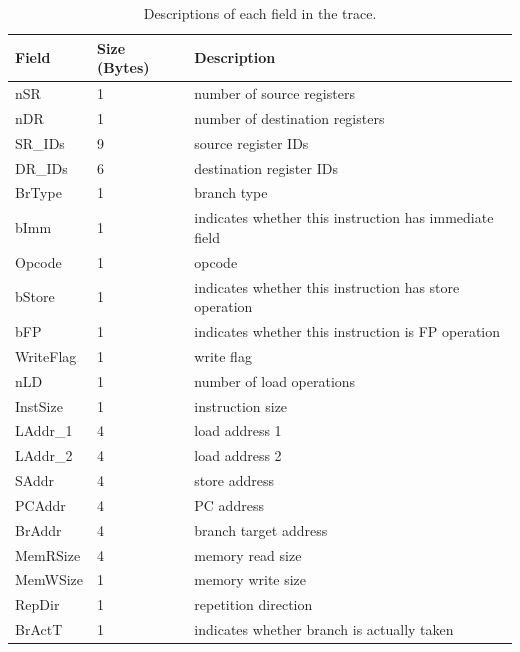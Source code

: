 \begin{table}[htb]
\begin{footnotesize}
\begin{center}
\caption{Descriptions of each field in the trace.}
\label{table:trace_desc}
\begin{tabular}{|l|l|l|} 
\hline
Field     & Size (Bytes)       & Description \\ \hline 
nSR       & 1                  & number of source registers \\ \hline
nDR       & 1                  & number of destination registers \\ \hline
SR\_IDs   & 9                  & source register IDs \\ \hline
DR\_IDs   & 6                  & destination register IDs \\ \hline
BrType    & 1                  & branch type \\ \hline
bImm      & 1                  & indicates whether this instruction has immediate field \\ \hline
Opcode    & 1                  & opcode \\ \hline
bStore    & 1                  & indicates whether this instruction has store operation \\ \hline
bFP       & 1                  & indicates whether this instruction is FP operation \\ \hline
WriteFlag & 1                  & write flag \\ \hline
nLD       & 1                  & number of load operations \\ \hline
InstSize  & 1                  & instruction size \\ \hline
LAddr\_1  & 4                  & load address 1 \\ \hline
LAddr\_2  & 4                  & load address 2 \\ \hline
SAddr     & 4                  & store address \\ \hline
PCAddr    & 4                  & PC address \\ \hline
BrAddr    & 4                  & branch target address \\ \hline
MemRSize  & 4                  & memory read size \\ \hline
MemWSize  & 1                  & memory write size \\ \hline
RepDir    & 1                  & repetition direction  \\ \hline
BrActT    & 1                  & indicates whether branch is actually taken \\ \hline

\end{tabular}
\end{center}
\end{footnotesize}
\end{table}

